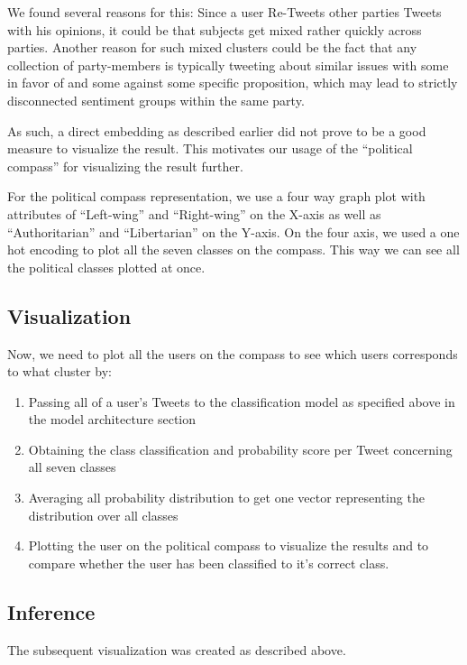 \documentclass[10pt, oneside]{article}
\begin{document}
\begin{multicols}{2}
We found several reasons for this:
Since a user Re-Tweets other parties Tweets with his opinions, it could be that subjects get mixed rather quickly across parties.
Another reason for such mixed clusters could be the fact that any collection of party-members is typically tweeting about similar issues with some in favor of and some against some specific proposition, which may lead to strictly disconnected sentiment groups within the same party.

As such, a direct embedding as described earlier did not prove to be a good measure to visualize the result. This motivates our usage of the ``political compass'' \cite{PoliticalCompass2017} for visualizing the result further. 

For the political compass representation, we use a four way graph plot with attributes of ``Left-wing'' and ``Right-wing'' on the X-axis as well as  ``Authoritarian'' and ``Libertarian'' on the Y-axis. On the four axis, we used a one hot encoding to plot all the seven classes on the compass. This way we can see all the political classes plotted at once.

\subsection{Visualization}

Now, we need to plot all the users on the compass to see which users corresponds to what cluster by:
\begin{enumerate}
	\item Passing all of a user's Tweets to the classification model as specified above in the model architecture section
	\item Obtaining the class classification and probability score per Tweet concerning all seven classes
	\item Averaging all probability distribution to get one vector representing the distribution over all classes
	\item Plotting the user on the political compass to visualize the results and to compare whether the user has been classified to it’s correct class.
\end{enumerate}

\subsection{Inference}

The subsequent visualization was created as described above.


\end{multicols}
\end{document}
